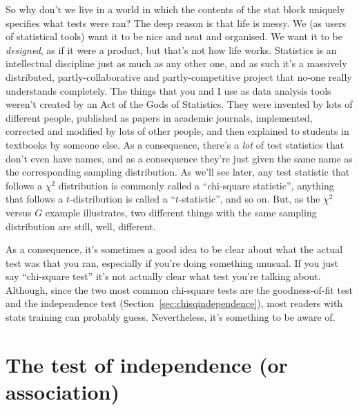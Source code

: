 So why don't we live in a world in which the contents of the stat block uniquely specifies what tests were ran? The deep reason is that life is messy. We (as users of statistical tools) want it to be nice and neat and organised. We want it to be {\it designed}, as if it were a product, but that's not how life works. Statistics is an intellectual discipline just as much as any other one, and as such it's a massively distributed, partly-collaborative and partly-competitive project that no-one really understands completely. The things that you and I use as data analysis tools weren't created by an Act of the Gods of Statistics. They were invented by lots of different people, published as papers in academic journals, implemented, corrected and modified by lots of other people, and then explained to students in textbooks by someone else. As a consequence, there's a {\it lot} of test statistics that don't even have names, and as a consequence they're just given the same name as the corresponding sampling distribution. As we'll see later, any test statistic that follows a $\chi^2$ distribution is commonly called a ``chi-square statistic'', anything that follows a $t$-distribution is called a ``$t$-statistic'', and so on. But, as the $\chi^2$ versus $G$ example illustrates, two different things with the same sampling distribution are still, well, different. 

As a consequence, it's sometimes a good idea to be clear about what the actual test was that you ran, especially if you're doing something unusual. If you just say ``chi-square test'' it's not actually clear what test you're talking about. Although, since the two most common chi-square tests are the goodness-of-fit test and the independence test (Section~\ref{sec:chisqindependence}), most readers with stats training can probably guess. Nevertheless, it's something to be aware of.


\section{The \texorpdfstring{}{} test of independence (or association)~\label{sec:chisqindependence}}

